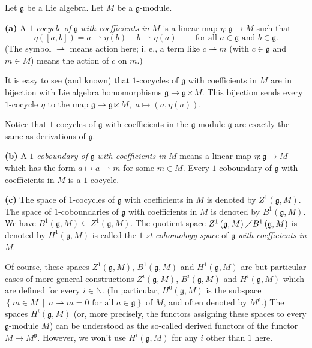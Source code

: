 \documentclass[etingof-lie.tex]{subfiles}
\begin{document}
\begin{definition}
Let $\mathfrak{g}$ be a Lie algebra. Let $M$ be a $\mathfrak{g}$-module.

\textbf{(a)} A $1$\textit{-cocycle} \textit{of }$\mathfrak{g}$\textit{ with
coefficients in }$M$ is a linear map $\eta:\mathfrak{g}\rightarrow M$ such
that%
\[
\eta\left(  \left[  a,b\right]  \right)  =a\rightharpoonup\eta\left(
b\right)  -b\rightharpoonup\eta\left(  a\right)  \ \ \ \ \ \ \ \ \ \ \text{for
all }a\in\mathfrak{g}\text{ and }b\in\mathfrak{g}.
\]
(The symbol $\rightharpoonup$ means action here; i. e., a term like
$c\rightharpoonup m$ (with $c\in\mathfrak{g}$ and $m\in M$) means the action
of $c$ on $m$.)

It is easy to see (and known) that $1$-cocycles of $\mathfrak{g}$ with
coefficients in $M$ are in bijection with Lie algebra homomorphisms
$\mathfrak{g}\rightarrow\mathfrak{g}\ltimes M$. This bijection sends every
$1$-cocycle $\eta$ to the map $\mathfrak{g}\rightarrow\mathfrak{g}\ltimes M,$
$a\mapsto\left(  a,\eta\left(  a\right)  \right)  $.

Notice that $1$-cocycles of $\mathfrak{g}$ with coefficients in the
$\mathfrak{g}$-module $\mathfrak{g}$ are exactly the same as derivations of
$\mathfrak{g}$.

\textbf{(b)} A $1$\textit{-coboundary of }$\mathfrak{g}$ \textit{with
coefficients in }$M$ means a linear map $\eta:\mathfrak{g}\rightarrow M$ which
has the form $a\mapsto a\rightharpoonup m$ for some $m\in M$. Every
$1$-coboundary of $\mathfrak{g}$ with coefficients in $M$ is a $1$-cocycle.

\textbf{(c)} The space of $1$-cocycles of $\mathfrak{g}$ with coefficients in
$M$ is denoted by $Z^{1}\left(  \mathfrak{g},M\right)  $. The space of
$1$-coboundaries of $\mathfrak{g}$ with coefficients in $M$ is denoted by
$B^{1}\left(  \mathfrak{g},M\right)  $. We have $B^{1}\left(  \mathfrak{g}%
,M\right)  \subseteq Z^{1}\left(  \mathfrak{g},M\right)  $. The quotient space
$Z^{1}\left(  \mathfrak{g},M\right)  \diagup B^{1}\left(  \mathfrak{g}%
,M\right)  $ is denoted by $H^{1}\left(  \mathfrak{g},M\right)  $ is called
the $1$\textit{-st cohomology space} of $\mathfrak{g}$\textit{ with
coefficients in }$M$.

Of course, these spaces $Z^{1}\left(  \mathfrak{g},M\right)  $, $B^{1}\left(
\mathfrak{g},M\right)  $ and $H^{1}\left(  \mathfrak{g},M\right)  $ are but
particular cases of more general constructions $Z^{i}\left(  \mathfrak{g}%
,M\right)  $, $B^{i}\left(  \mathfrak{g},M\right)  $ and $H^{i}\left(
\mathfrak{g},M\right)  $ which are defined for every $i\in\mathbb{N}$. (In
particular, $H^{0}\left(  \mathfrak{g},M\right)  $ is the subspace $\left\{
m\in M\ \mid\ a\rightharpoonup m=0\text{ for all }a\in\mathfrak{g}\right\}  $
of $M$, and often denoted by $M^{\mathfrak{g}}$.) The spaces $H^{i}\left(
\mathfrak{g},M\right)  $ (or, more precisely, the functors assigning these
spaces to every $\mathfrak{g}$-module $M$) can be understood as the so-called
derived functors of the functor $M\mapsto M^{\mathfrak{g}}$. However, we won't
use $H^{i}\left(  \mathfrak{g},M\right)  $ for any $i$ other than $1$ here.


\end{definition}
\end{document}
